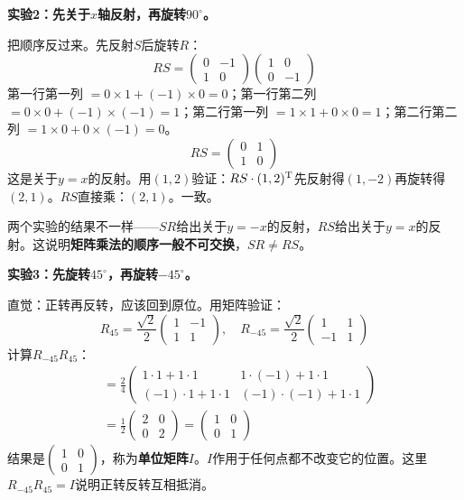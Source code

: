 \textbf{实验2：先关于$x$轴反射，再旋转$90^\circ$。}

把顺序反过来。先反射$S$后旋转$R$：
\[
RS = \begin{pmatrix}0&-1\\1&0\end{pmatrix}
\begin{pmatrix}1&0\\0&-1\end{pmatrix}
\]
第一行第一列 $=0\times1+(-1)\times0=0$；第一行第二列 $=0\times0+(-1)\times(-1)=1$；第二行第一列 $=1\times1+0\times0=1$；第二行第二列 $=1\times0+0\times(-1)=0$。
\[
RS = \begin{pmatrix}0&1\\1&0\end{pmatrix}
\]
这是关于$y=x$的反射。用$(1,2)$验证：$RS\cdot(1,2)^\text T$先反射得$(1,-2)$再旋转得$(2,1)$。$RS$直接乘：$(2,1)$。一致。

两个实验的结果不一样——$SR$给出关于$y=-x$的反射，$RS$给出关于$y=x$的反射。这说明\textbf{矩阵乘法的顺序一般不可交换}，$SR\neq RS$。

\textbf{实验3：先旋转$45^\circ$，再旋转$-45^\circ$。}

直觉：正转再反转，应该回到原位。用矩阵验证：
\[
R_{45}=\frac{\sqrt2}{2}\begin{pmatrix}1&-1\\1&1\end{pmatrix},\quad
R_{-45}=\frac{\sqrt2}{2}\begin{pmatrix}1&1\\-1&1\end{pmatrix}
\]
计算$R_{-45}R_{45}$：
\begin{align*}
&= \frac24\begin{pmatrix}1\cdot1+1\cdot1 & 1\cdot(-1)+1\cdot1\\ (-1)\cdot1+1\cdot1 & (-1)\cdot(-1)+1\cdot1\end{pmatrix}\\
&= \frac12\begin{pmatrix}2&0\\0&2\end{pmatrix}
= \begin{pmatrix}1&0\\0&1\end{pmatrix}
\end{align*}
结果是$\begin{pmatrix}1&0\\0&1\end{pmatrix}$，称为\textbf{单位矩阵}$I$。$I$作用于任何点都不改变它的位置。这里$R_{-45}R_{45}=I$说明正转反转互相抵消。


